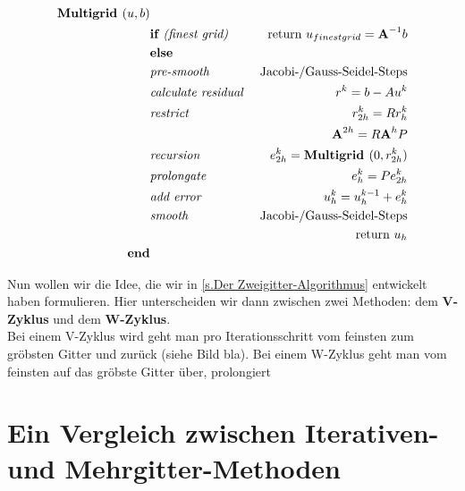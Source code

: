 \begin{eqnarray}
\textbf{Multigrid }(u,b)                         & \notag \\
&\textbf{if }\textit{(finest grid) }&\textnormal{return } u_{finest grid}={\textbf{A}}^{-1}b \notag \\
&\textbf{else }                                                & \notag \\
&\textit{pre-smooth }                                 &\textnormal{Jacobi-/Gauss-Seidel-Steps} \notag \\
&\textit{calculate residual }                &r^{k} = b - Au^{k} \notag \\
&\textit{restrict }                                 &r^{k}_{2h}=Rr^{k}_{h} \notag \\
&                                                                        &{\textbf{A}}^{2h} = R{\textbf{A}}^{h}P \notag \\
&\textit{recursion }                                &e^{k}_{2h} = \textbf{Multigrid }(0,r^{k}_{2h}) \notag \\
&\textit{prolongate }                                &e^{k}_{h} = Pe^{k}_{2h} \notag \\
&\textit{add error }                                &u^{k}_{h} = u^{k-1}_{h} + e^{k}_{h} \notag \\
&\textit{smooth }                                        &\textnormal{Jacobi-/Gauss-Seidel-Steps} \notag \\
&                                                                        &\textnormal{return } u_{h} \notag \\
\textbf{end}                                                & \notag
\end{eqnarray}

Nun wollen wir die Idee, die wir in \autoref{s.Der Zweigitter-Algorithmus} entwickelt haben formulieren. Hier unterscheiden wir dann zwischen zwei Methoden: dem \textbf{V-Zyklus} und dem \textbf{W-Zyklus}. \\
Bei einem V-Zyklus wird geht man pro Iterationsschritt vom feinsten zum gröbsten Gitter und zurück (siehe Bild bla). Bei einem W-Zyklus geht man vom feinsten auf das gröbste Gitter über, prolongiert 

\chapter{Ein Vergleich zwischen Iterativen- und Mehrgitter-Methoden}\label{c.Vergleich}

